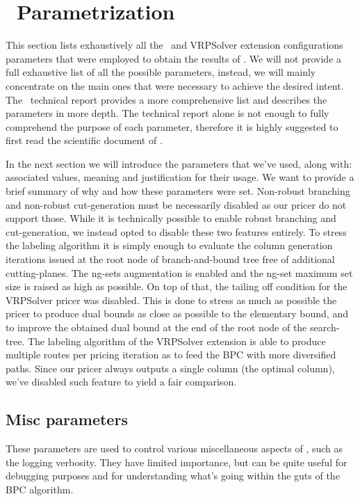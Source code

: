 \chapter{\bapcod\ Parametrization}
\label{sec:bapcod-appendix}

This section lists exhaustively all the \bapcod\ and VRPSolver extension
configurations parameters that were employed  to obtain the results of .
We will not provide a full exhaustive list of all the possible parameters,
instead, we will mainly concentrate on the main ones that were necessary to achieve
the desired intent.
The \bapcod\ technical report \textcite{sadykov2021} provides a more
comprehensive list and describes the parameters in more depth.
The technical report alone is not enough to fully comprehend the purpose of each parameter,
therefore it is highly suggested to first read the scientific document of \textcite{pessoa2020generic}.

\medskip

In the next section we will introduce the parameters that we've used, along
with: associated values, meaning and justification for their usage.
We want to provide a brief summary of why and how these parameters were set.
Non-robust branching and non-robust cut-generation
must be necessarily disabled as our pricer do not support those.
While it is technically possible to enable robust branching and cut-generation,
we instead opted to disable these two features entirely.
To stress the labeling algorithm it is simply enough to evaluate
the column generation iterations issued at the root node of branch-and-bound tree
free of additional cutting-planes.
The ng-sets augmentation is enabled and the ng-set maximum
set size is raised as high as possible.
On top of that, the tailing off condition for the VRPSolver pricer was disabled.
This is done to stress as much as possible the pricer to produce
dual bounds as close as possible to the elementary bound, and to
improve the obtained dual bound at the end of the root node of the search-tree.
The labeling algorithm of the VRPSolver extension is able to produce multiple
routes per pricing iteration as to feed the BPC with more diversified paths.
Since our pricer always outputs a single column (the optimal column),
we've disabled such feature to yield a fair comparison.

\section{Misc parameters}
These parameters are used to control various miscellaneous aspects of \bapcod,
such as the logging verbosity.
They have limited importance, but can be quite useful for debugging purposes
and for understanding what's going within the guts of the BPC algorithm.

